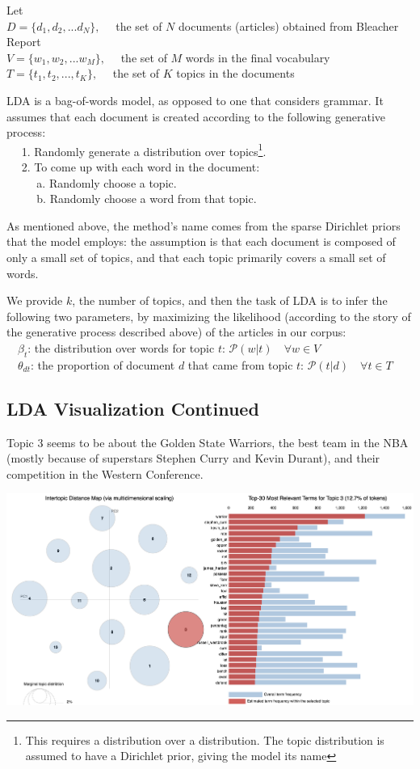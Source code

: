 \documentclass[11pt]{article}
\begin{document}
Let \\
$D = \{d_1, d_2, ... d_N \}, \quad$ the set of $N$ documents (articles) obtained from Bleacher Report \\
$V = \{w_1, w_2, ... w_M \}, \quad$ the set of $M$ words in the final vocabulary \\
$T = \{t_1, t_2, ..., t_K\}, \quad$ the set of $K$ topics in the documents 

LDA is a bag-of-words model, as opposed to one that considers grammar.  It assumes that each document is created according to the following generative process: \\
$\text{} \quad$ 1. Randomly generate a distribution over topics\footnote{This requires a distribution over a distribution. The  topic distribution is assumed to have a Dirichlet prior, giving the model its name}. \\
$\text{} \quad$ 2. To come up with each word in the document: \\
$\text{} \quad$ $\quad$ a. Randomly choose a topic. \\
$\text{} \quad$ $\quad$ b. Randomly choose a word from that topic. 

As mentioned above, the method's name comes from the sparse Dirichlet priors that the model employs: the assumption is that each document is composed of only a small set of topics, and that each topic primarily covers a small set of words.

We provide $k$, the number of topics, and then the task of LDA is to infer the following two parameters, by maximizing the likelihood (according to the story of the generative process described above) of the articles in our corpus: \\
$\text{} \quad \beta_t$: the distribution over words for topic $t$: $\mathcal{P}(w | t) \quad \forall w \in V$ \\
$\text{} \quad \theta_{dt}$: the proportion of document $d$ that came from topic $t$: $\mathcal{P}(t | d) \quad \forall t \in T$ 

\subsection{LDA Visualization Continued}
Topic 3 seems to be about the Golden State Warriors, the best team in the NBA (mostly because of superstars Stephen Curry and Kevin Durant), and their competition in the Western Conference.

\includegraphics[width=470pt]{3.png} \\
\end{document}
